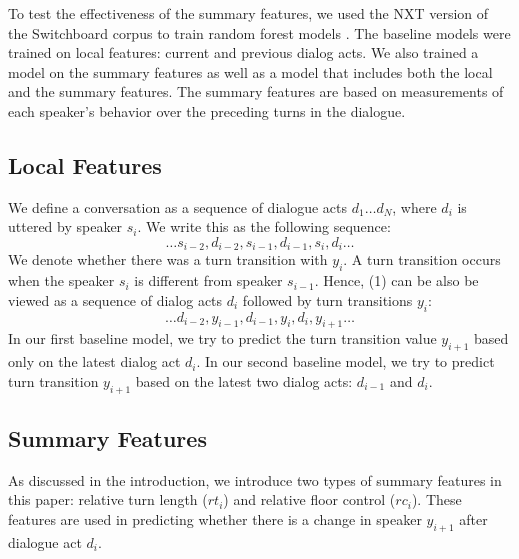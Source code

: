 To test the effectiveness of the summary features, we used the NXT version of the Switchboard corpus \cite{calhoun2010nxt,Godfrey-etal92:icassp} to train random forest models \cite{scikit-learn}. The baseline models were trained on local features: current and previous dialog acts. We also trained a model on the summary features as well as a model that includes both the local and the summary features.
The summary features are based on measurements of each speaker's behavior over the preceding turns in the dialogue.

     \subsection{Local Features}

     We define a conversation as a sequence of dialogue acts $d_1 \dots d_N$, where $d_i$ is uttered by speaker $s_i$.  We write this as the following sequence:
%
     \begin{equation}
       \ldots  s_{i-2}, d_{i-2}, s_{i-1} , d_{i-1}, s_i, d_i  \ldots
     \end{equation}
     We denote whether there was a turn transition with $y_i$. A turn transition occurs when the speaker $s_i$ is different from speaker $s_{i-1}$. Hence, (1) can be also be viewed as a sequence of dialog acts $d_i$ followed by turn transitions $y_i$:
%
     \begin{equation}
       \ldots    d_{i-2}, y_{i-1}, d_{i-1}, y_{i} , d_i, y_{i+1} \ldots
     \end{equation}
      In our first baseline model, we try to predict the turn transition value $y_{i+1}$ based only on the latest dialog act $d_i$. In our second baseline model, we try to predict turn transition $y_{i+1}$ based on the latest two dialog acts: $d_{i-1}$ and $d_i$.


     \subsection{Summary Features}\label{sfeatures}

     As discussed in the introduction, we introduce two types of summary features in this paper: relative turn length ($rt_i$) and relative floor control ($rc_i$).  These features are used in predicting whether there is a change in speaker $y_{i+1}$ after dialogue act $d_i$.

